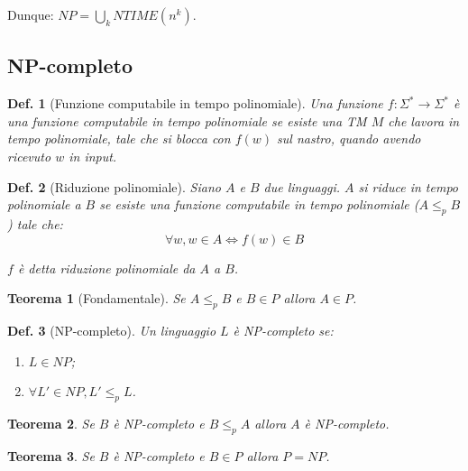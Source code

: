 \documentclass[11pt]{article}
\newtheorem{definition}{Def.}[section]
\newtheorem{theorem}{Teorema}[section]
\begin{document}
Dunque: $NP = \bigcup_k NTIME(n^k)$.

\subsection{NP-completo}

\begin{definition}[Funzione computabile in tempo polinomiale]
	Una funzione $f: \Sigma^* \rightarrow \Sigma^*$ è una funzione computabile 
	in tempo polinomiale se esiste una TM
	$M$ che lavora in tempo polinomiale, tale che si blocca con $f(w)$ sul
	nastro, quando avendo ricevuto $w$ in input.
\end{definition}

\begin{definition}[Riduzione polinomiale]
	Siano $A$ e $B$ due linguaggi. $A$ si riduce in tempo polinomiale a $B$ se 
	esiste una funzione computabile in tempo polinomiale ($ A \leq_p B$) tale 
	che:
	\begin{equation}
		\forall w, w \in A \iff f(w) \in B
	\end{equation}

	$f$ è detta riduzione polinomiale da $A$ a $B$.
\end{definition}

\begin{theorem}[Fondamentale]
	Se $A \leq_p B$ e $B \in P$ allora $A \in P$.
\end{theorem}

\begin{definition}[NP-completo]
	Un linguaggio $L$ è NP-completo se:
	\begin{enumerate}
		\item $L \in NP$;
		\item $\forall L' \in NP, L' \leq_p L$.
	\end{enumerate}
\end{definition}

\begin{theorem}
	Se $B$ è NP-completo e $B \leq_p A$ allora $A$ è NP-completo.
\end{theorem}

\begin{theorem}
	Se $B$ è NP-completo e $B \in P$ allora $P = NP$.
\end{theorem}
\end{document}
